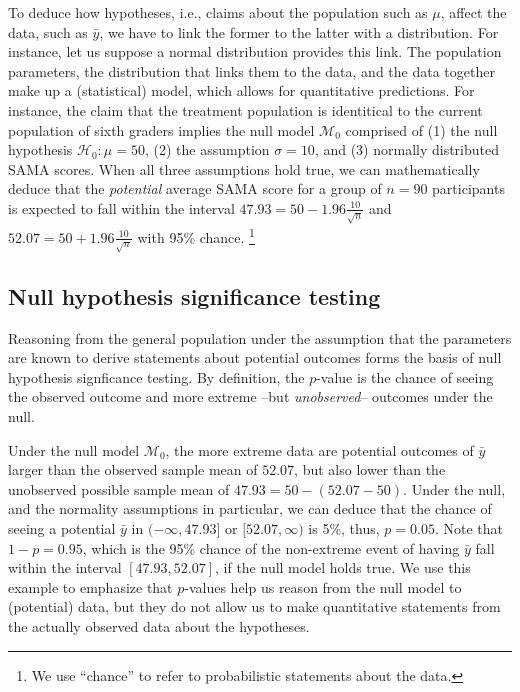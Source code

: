 \documentclass[english,,doc,floatsintext]{apa6}
\let\rmarkdownfootnote\footnote%
\def\footnote{\protect\rmarkdownfootnote}
\begin{document}
To deduce how hypotheses, i.e., claims about the population such as \(\mu\), affect the data, such as \(\bar{y}\), we have to link the former to the latter with a distribution. For instance, let us suppose a normal distribution provides this link. The population parameters, the distribution that links them to the data, and the data together make up a (statistical) model, which allows for quantitative predictions. For instance, the claim that the treatment population is identitical to the current population of sixth graders implies the null model \(\mathcal{M}_{0}\) comprised of (1) the null hypothesis \(\mathcal{H}_{0}: \mu = 50\), (2) the assumption \(\sigma = 10\), and (3) normally distributed SAMA scores. When all three assumptions hold true, we can mathematically deduce that the \emph{potential} average SAMA score for a group of \(n = 90\) participants is expected to fall within the interval \(47.93 = 50 - 1.96 \frac{10}{\sqrt{n}}\) and \(52.07 = 50 + 1.96 \frac{10}{\sqrt{n}}\) with 95\% chance.
\footnote{We use ``chance'' to refer to probabilistic statements about the data.}

\subsection{Null hypothesis significance testing}

Reasoning from the general population under the assumption that the parameters are known to derive statements about potential outcomes forms the basis of null hypothesis signficance testing. By definition, the \(p\)-value is the chance of seeing the observed outcome and more extreme --but \emph{unobserved}-- outcomes under the null.

Under the null model \(\mathcal{M}_{0}\), the more extreme data are potential outcomes of \(\bar{y}\) larger than the observed sample mean of \(52.07\), but also lower than the unobserved possible sample mean of \(47.93 = 50 - (52.07-50)\). Under the null, and the normality assumptions in particular, we can deduce that the chance of seeing a potential \(\bar{y}\) in \((- \infty, 47.93]\) or \([52.07, \infty)\) is 5\%, thus, \(p=0.05\). Note that \(1 - p = 0.95\), which is the 95\% chance of the non-extreme event of having \(\bar{y}\) fall within the interval \([47.93, 52.07]\), if the null model holds true. We use this example to emphasize that \(p\)-values help us reason from the null model to (potential) data, but they do not allow us to make quantitative statements from the actually observed data about the hypotheses.
\end{document}

